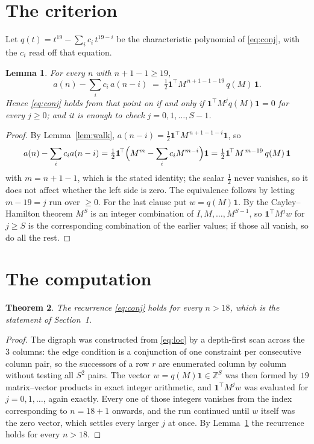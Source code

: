 \documentclass[11pt,a4paper]{article}
\theoremstyle{plain}
\newtheorem{theorem}{Theorem}
\newtheorem{lemma}[theorem]{Lemma}
\theoremstyle{definition}
\begin{document}
\section{The criterion}

Let $q(t)=t^{19}-\sum_i c_i\,t^{19-i}$ be the characteristic polynomial of
\eqref{eq:conj}, with the $c_i$ read off that equation.

\begin{lemma}\label{lem:crit}
For every $n$ with $n+1-1\ge19$,
\[
a(n)-\sum_i c_i\,a(n-i)\;=\;\tfrac1{2}\mathbf{1}^{\!\top}M^{\,n+1-1-19}\,q(M)\,\mathbf{1} .
\]
Hence \eqref{eq:conj} holds from that point on if and only if
$\mathbf{1}^{\!\top}M^{j}q(M)\mathbf{1}=0$ for every $j\ge0$; and it is enough to check
$j=0,1,\dots,S-1$.
\end{lemma}

\begin{proof}
By Lemma~\ref{lem:walk}, $a(n-i)=\tfrac1{2}\mathbf{1}^{\!\top}M^{\,n+1-1-i}\mathbf{1}$, so
\[
a(n)-\sum_i c_i a(n-i)
=\tfrac1{2}\mathbf{1}^{\!\top}\Bigl(M^{m}-\sum_i c_i M^{m-i}\Bigr)\mathbf{1}
=\tfrac1{2}\mathbf{1}^{\!\top}M^{\,m-19}\,q(M)\,\mathbf{1}
\]
with $m=n+1-1$, which is the stated identity; the scalar $\tfrac1{2}$ never vanishes, so
it does not affect whether the left side is zero. The equivalence follows by letting
$m-19=j$ run over $\ge0$. For the last clause put $w=q(M)\mathbf{1}$. By the
Cayley--Hamilton theorem $M^{S}$ is an integer combination of $I,M,\dots,M^{S-1}$, so
$\mathbf{1}^{\!\top}M^{j}w$ for $j\ge S$ is the corresponding combination of the earlier
values; if those all vanish, so do all the rest.
\end{proof}

\section{The computation}

\begin{theorem}
The recurrence \eqref{eq:conj} holds for every $n>18$, which is the statement of
Section~1.
\end{theorem}

\begin{proof}
The digraph was constructed from \eqref{eq:loc} by a depth-first scan across the $3$
columns: the edge condition is a conjunction of one constraint per consecutive column
pair, so the successors of a row $r$ are enumerated column by column without testing all
$S^2$ pairs. The vector $w=q(M)\mathbf{1}\in\mathbb{Z}^{S}$ was then formed by $19$
matrix--vector products in exact integer arithmetic, and $\mathbf{1}^{\!\top}M^{j}w$ was
evaluated for $j=0,1,\dots$, again exactly. Every one of those integers vanishes from the
index corresponding to $n=18+1$ onwards, and the run continued until $w$ itself was the
zero vector, which settles every larger $j$ at once. By Lemma~\ref{lem:crit} the recurrence
holds for every $n>18$.
\end{proof}
\end{document}
